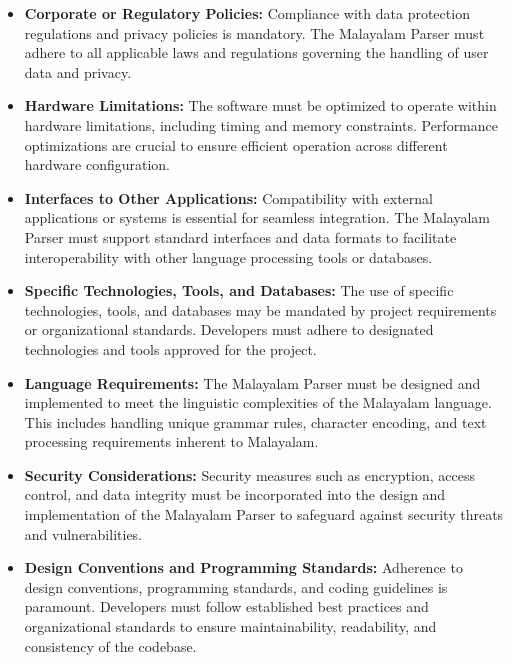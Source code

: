\documentclass[12pt]{article}
\begin{document}
	\begin{itemize}[label=-]
		\item \textbf{Corporate or Regulatory Policies:} Compliance with data protection regulations
		and privacy policies is mandatory. The Malayalam Parser must adhere to all
		applicable laws and regulations governing the handling of user data and privacy.
		\item \textbf{Hardware Limitations:} The software must be optimized to operate within
		hardware limitations, including timing and memory constraints. Performance
		optimizations are crucial to ensure efficient operation across different hardware
		configuration.
		\item \textbf{Interfaces to Other Applications:} Compatibility with external applications or
		systems is essential for seamless integration. The Malayalam Parser must support
		standard interfaces and data formats to facilitate interoperability with other
		language processing tools or databases.
		\item \textbf{Specific Technologies, Tools, and Databases:} The use of specific technologies,
		tools, and databases may be mandated by project requirements or organizational
		standards. Developers must adhere to designated technologies and tools approved
		for the project.
		\item \textbf{Language Requirements:} The Malayalam Parser must be designed and
		implemented to meet the linguistic complexities of the Malayalam language. This
		includes handling unique grammar rules, character encoding, and text processing
		requirements inherent to Malayalam.
		\item \textbf{Security Considerations:} Security measures such as encryption, access control,
		and data integrity must be incorporated into the design and implementation of the
		Malayalam Parser to safeguard against security threats and vulnerabilities.
		\item \textbf{Design Conventions and Programming Standards:} Adherence to design
		conventions, programming standards, and coding guidelines is paramount.
		Developers must follow established best practices and organizational standards to
		ensure maintainability, readability, and consistency of the codebase.
	\end{itemize}
\end{document}
